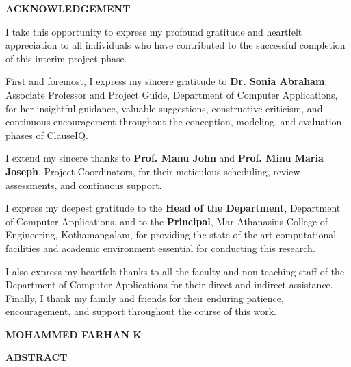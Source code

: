 \documentclass[12pt, a4paper]{report}
\begin{document}
\newpage
\begin{center}
    {\bfseries\fontsize{16}{19}\selectfont ACKNOWLEDGEMENT\par}
\end{center}

\vspace{0.2in}

{\justifying\fontsize{12}{17}\selectfont
I take this opportunity to express my profound gratitude and heartfelt appreciation to all individuals who have contributed to the successful completion of this interim project phase.

First and foremost, I express my sincere gratitude to \textbf{Dr. Sonia Abraham}, Associate Professor and Project Guide, Department of Computer Applications, for her insightful guidance, valuable suggestions, constructive criticism, and continuous encouragement throughout the conception, modeling, and evaluation phases of ClauseIQ.

I extend my sincere thanks to \textbf{Prof. Manu John} and \textbf{Prof. Minu Maria Joseph}, Project Coordinators, for their meticulous scheduling, review assessments, and continuous support.

I express my deepest gratitude to the \textbf{Head of the Department}, Department of Computer Applications, and to the \textbf{Principal}, Mar Athanasius College of Engineering, Kothamangalam, for providing the state-of-the-art computational facilities and academic environment essential for conducting this research.

I also express my heartfelt thanks to all the faculty and non-teaching staff of the Department of Computer Applications for their direct and indirect assistance. Finally, I thank my family and friends for their enduring patience, encouragement, and support throughout the course of this work.\par}

\vspace{0.5in}
\begin{flushright}
    \textbf{MOHAMMED FARHAN K}
\end{flushright}

\newpage
\begin{center}
    {\bfseries\fontsize{16}{19}\selectfont ABSTRACT\par}
\end{center}
\end{document}
